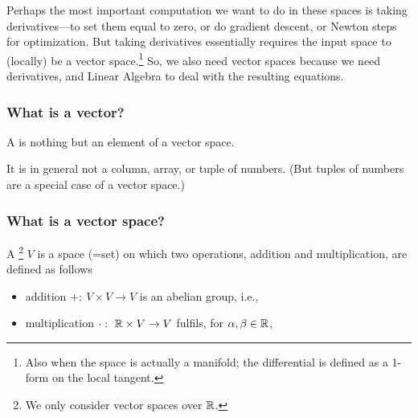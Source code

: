 Perhaps the most important computation we want to do in these spaces
is taking derivatives---to set them equal to zero, or do gradient
descent, or Newton steps for optimization. But taking derivatives
essentially requires the input space to (locally) be a vector
space.\footnote{Also when the space is actually a manifold; the
  differential is defined as a 1-form on the local tangent.}  So, we
also need vector spaces because we need derivatives, and Linear
Algebra to deal with the resulting equations.


\subsubsection{What is a vector?}

A  is nothing but an element of a vector space.

It is in general not a column, array, or tuple of numbers. (But tuples of
numbers are a special case of a vector space.)



\subsubsection{What is a vector space?}

\begin{myDefinition}
A \footnote{We only consider vector spaces over ${\mathbb{R}}$.}
$V$ is a space (=set) on which two operations, addition and
multiplication, are defined as follows
\begin{itemize}
\item addition $+:~ V \times V \to V$ is an abelian group, i.e.,
\item multiplication $\cdot:~ {\mathbb{R}} \times V \to V$ fulfils, for $\alpha,\beta\in{\mathbb{R}}$, 
\end{itemize}
\end{myDefinition}

